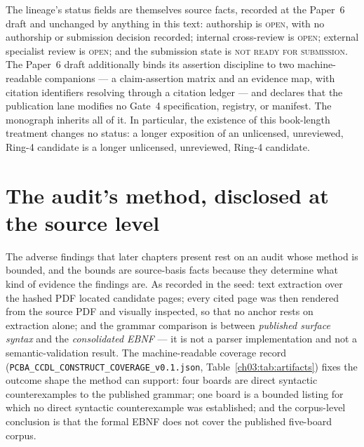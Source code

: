 The lineage's status fields are themselves source facts, recorded at
the Paper~6 draft and unchanged by anything in this text: authorship is
\textsc{open}, with no authorship or submission decision recorded;
internal cross-review is \textsc{open}; external specialist review is
\textsc{open}; and the submission state is \textsc{not ready for
submission}. The Paper~6 draft additionally binds its assertion
discipline to two machine-readable companions --- a claim-assertion
matrix and an evidence map, with citation identifiers resolving through
a citation ledger --- and declares that the publication lane modifies
no Gate~4 specification, registry, or manifest. The monograph inherits
all of it. In particular, the existence of this book-length treatment
changes no status: a longer exposition of an unlicensed, unreviewed,
Ring-4 candidate is a longer unlicensed, unreviewed, Ring-4 candidate.

\section{The audit's method, disclosed at the source level}\label{ch03:auditmethod}

The adverse findings that later chapters present rest on an audit whose
method is bounded, and the bounds are source-basis facts because they
determine what kind of evidence the findings are. As recorded in the
seed: text extraction over the hashed PDF located candidate pages;
every cited page was then rendered from the source PDF and visually
inspected, so that no anchor rests on extraction alone; and the
grammar comparison is between \emph{published surface syntax} and the
\emph{consolidated EBNF} --- it is not a parser implementation and not
a semantic-validation result. The machine-readable coverage record
(\texttt{PCBA\_CCDL\_CONSTRUCT\_COVERAGE\_v0.1.json},
Table~\ref{ch03:tab:artifacts}) fixes the outcome shape the method can
support: four boards are direct syntactic counterexamples to the
published grammar; one board is a bounded listing for which no direct
syntactic counterexample was established; and the corpus-level
conclusion is that the formal EBNF does not cover the published
five-board corpus.


